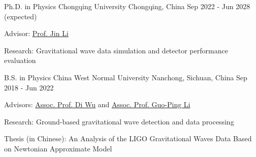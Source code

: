 

\begin{cventries}

  \cventry
    {Ph.D. in Physics} %
    {Chongqing University} %
    {Chongqing, China}%
    {Sep 2022 - Jun 2028 (expected)} %
    {
      \begin{cvitems} %
        \item{Advisor: \href{https://inspirehep.net/authors/1456898?ui-citation-summary=true&ui-exclude-self-citations=true}{Prof. Jin Li}}
        \item{Research: Gravitational wave data simulation and detector performance evaluation}
      \end{cvitems}
    }

  \cventry
    {B.S. in Physics} %
    {China West Normal University} %
    {Nanchong, Sichuan, China}%
    {Sep 2018 - Jun 2022} %
    {
      \begin{cvitems} %
        \item{Advisors: \href{https://inspirehep.net/authors/1647692?ui-citation-summary=true&ui-exclude-self-citations=true}{Assoc. Prof. Di Wu} and \href{https://inspirehep.net/authors/1275221?ui-citation-summary=true&ui-exclude-self-citations=true}{Assoc. Prof. Guo-Ping Li}}
        \item{Research: Ground-based gravitational wave detection and data processing}
        \item{Thesis (in Chinese): An Analysis of the LIGO Gravitational Waves Data Based on Newtonian Approximate Model}
      \end{cvitems}
    }

\end{cventries}
